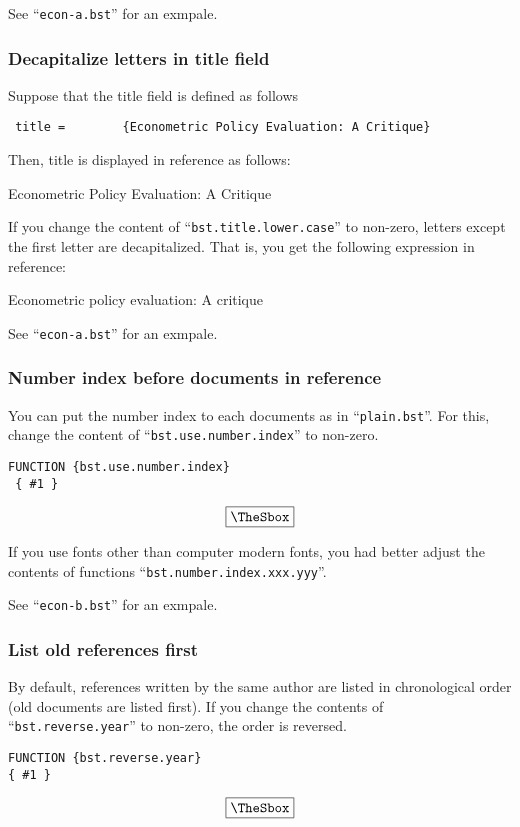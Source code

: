 \documentclass[10pt]{article}
\newenvironment{Frame}%
{\setlength{\fboxsep}{15pt}
\setlength{\mylength}{\linewidth}%
\addtolength{\mylength}{-2\fboxsep}%
\addtolength{\mylength}{-2\fboxrule}%
\Sbox
\minipage{\mylength}%
\setlength{\abovedisplayskip}{0pt}%
\setlength{\belowdisplayskip}{0pt}%
}%
{\endminipage\endSbox
\[\fbox{\TheSbox}\]}
\begin{document}
See ``\texttt{econ-a.bst}'' for an exmpale.

\subsubsection{Decapitalize letters in title field}

Suppose that the title field is defined as follows
\begin{center}
  \verb| title =        {Econometric Policy Evaluation: A Critique}|
\end{center}

Then, title is displayed in reference as follows:
\begin{center}
 Econometric Policy Evaluation: A Critique
\end{center}

If you change the content of ``\texttt{bst.title.lower.case}'' to
non-zero, letters except the first letter are decapitalized.  That is,
you get the following expression in reference:
\begin{center}
 Econometric policy evaluation: A critique
\end{center}

See ``\texttt{econ-a.bst}'' for an exmpale.


\subsubsection{Number index before documents in reference}

You can put the number index to each documents as in
``\texttt{plain.bst}''.  For this, change the content of
``\texttt{bst.use.number.index}'' to non-zero.
\begin{Frame}
\begin{verbatim}
FUNCTION {bst.use.number.index}
 { #1 }
\end{verbatim}
\end{Frame}

If you use fonts other than computer modern fonts, you had better adjust
the contents of functions ``\texttt{bst.number.index.xxx.yyy}''.

See ``\texttt{econ-b.bst}'' for an exmpale.


\subsubsection{List old references first}

By default, references written by the same author are listed in
chronological order (old documents are listed first).  If you change the
contents of ``\texttt{bst.reverse.year}'' to non-zero, the order is
reversed.
\begin{Frame}
\begin{verbatim}
FUNCTION {bst.reverse.year}
{ #1 }
\end{verbatim}
\end{Frame}
\end{document}
